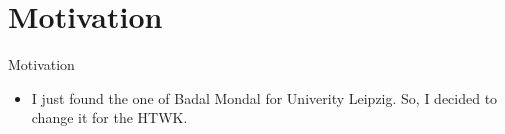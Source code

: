 \section{Motivation}
\begin{frame}{Motivation}
\begin{itemize}
    \item I just found the one of Badal Mondal for Univerity Leipzig. So, I decided to change it for the HTWK. 
\end{itemize}
\end{frame}